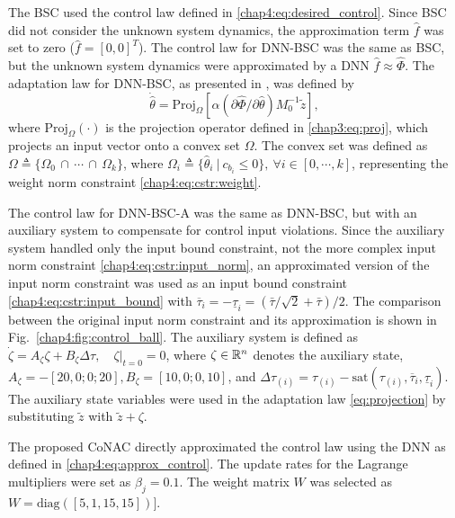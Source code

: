 The BSC used the control law defined in \eqref{chap4:eq:desired_control}. 
Since BSC did not consider the unknown system dynamics, the approximation term $\hat f$ was set to zero (\ie $\hat f = [0,0]^T$).
The control law for DNN-BSC was the same as BSC, but the unknown system dynamics were approximated by a DNN \ie $\hat f\approx \hat\Phi$. 
The adaptation law for DNN-BSC, as presented in \cite{RN13}, was defined by 
\begin{equation}\label{eq:projection}
    \dot {\hat\theta}= \text{Proj}_{\Omega}[\alpha  (\partial \hat\Phi/\partial \hat\theta)M_0^{-1}{\tilde z}],
\end{equation}
where $\text{Proj}_{\Omega}(\cdot)$ is the projection operator defined in \eqref{chap3:eq:proj}, which projects an input vector onto a convex set $\Omega$. 
The convex set was defined as ${\Omega}\triangleq \{\Omega_0\,\cap\,\cdots\,\cap\, \Omega_k\}$, where $\Omega_i\triangleq \{\hat\theta_i\ \vert \ c_{b_i}\le 0\}, \ \forall i\in[0,\cdots, k]$, representing the weight norm constraint \eqref{chap4:eq:cstr:weight}.

The control law for DNN-BSC-A was the same as DNN-BSC, but with an auxiliary system to compensate for control input violations. 
Since the auxiliary system handled only the input bound constraint, not the more complex input norm constraint \eqref{chap4:eq:cstr:input_norm}, an approximated version of the input norm constraint was used as an input bound constraint \eqref{chap4:eq:cstr:input_bound} with ${\overline\tau_i} = -{\underline\tau_i} = (\bar\tau/\sqrt{2}+\bar\tau)/2$. 
The comparison between the original input norm constraint and its approximation is shown in Fig.~\ref{chap4:fig:control_ball}.
The auxiliary system is defined as $\dot\zeta = A_\zeta \zeta + B_\zeta \Delta\tau,\quad \zeta\vert_{t=0} = 0$, where $\zeta\in\mathbb{R}^n$ denotes the auxiliary state, $A_\zeta=-[20,0;0;20],B_\zeta=[10,0;0,10]$, and $\Delta\tau_{(i)} = \tau_{(i)}-\text{sat}(\tau_{(i)},{\overline\tau_i},{\underline\tau_i})$.
The auxiliary state variables were used in the adaptation law \eqref{eq:projection} by substituting ${\tilde z}$ with ${\tilde z}+\zeta$.

The proposed CoNAC directly approximated the control law using the DNN as defined in \eqref{chap4:eq:approx_control}. 
The update rates for the Lagrange multipliers were set as $\beta_{j}=0.1$. 
The weight matrix $W$ was selected as $W=\text{diag}([5,1,15,15])]$.

